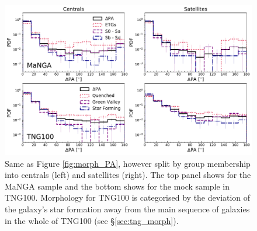 \begin{figure}
    \centering
	\includegraphics[width=\linewidth]{misalignment_MaNGA/MPL8_TNG_morph_group_PA.pdf}
    \caption{Same as Figure \ref{fig:morph_PA}, however split by group membership into centrals (left) and satellites (right). The top panel shows for the MaNGA sample and the bottom shows for the mock sample in TNG100. Morphology for TNG100 is categorised by the deviation of the galaxy's star formation away from the main sequence of galaxies in the whole of TNG100 (see \S\ref{sec:tng_morph}).}
    \label{fig:group_morph_PA}
\end{figure}

